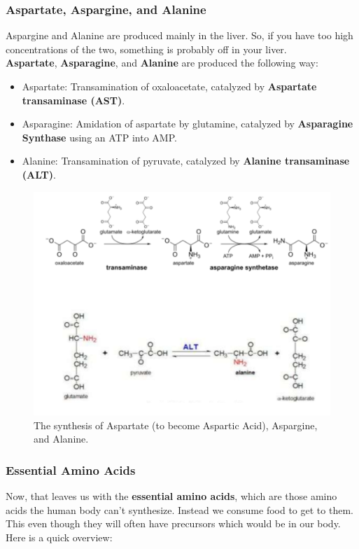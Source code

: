 \documentclass[../main.tex]{subfiles}
\begin{document}
\subsubsection{Aspartate, Aspargine, and Alanine}

Aspargine and Alanine are produced mainly in the liver. So, if you have too high concentrations of the two, something is probably off in your liver. \\

\textbf{\gls{Aspartate}}, \textbf{\gls{Asparagine}}, and \textbf{\gls{Alanine}} are produced the following way:
\begin{itemize}
	\item Aspartate: Transamination of oxaloacetate, catalyzed by \textbf{\gls{Aspartate transaminase (AST)}}.
	\item Asparagine: Amidation of aspartate by glutamine, catalyzed by \textbf{\gls{Asparagine Synthase}} using an ATP into AMP.
	\item Alanine: Transamination of pyruvate, catalyzed by \textbf{\gls{Alanine transaminase (ALT)}}.
\end{itemize}

\begin{figure}[H]
	\centering
	\includegraphics[width=0.7\linewidth]{asp_arg_ala}
	\caption{The synthesis of Aspartate (to become Aspartic Acid), Aspargine, and Alanine.}
	\label{fig:aspargala}
\end{figure}


\subsubsection{Essential Amino Acids}

Now, that leaves us with the \textbf{\gls{essential amino acids}}, which are those amino acids the human body can't synthesize. Instead we consume food to get to them. This even though they will often have precursors which would be in our body. Here is a quick overview:
\end{document}
